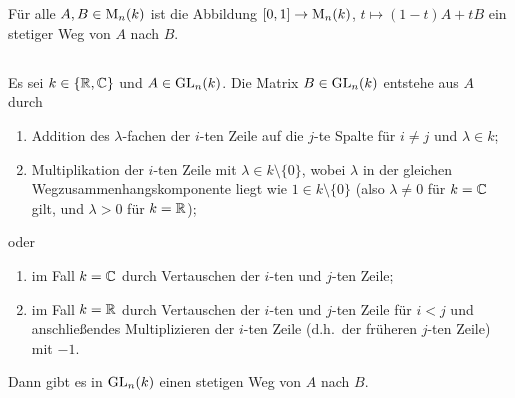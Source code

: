 \section{}





\subsection{}

Für alle $A, B \in \operatorname{M}_{n}(k)$ ist die Abbildung $[0,1] \to \operatorname{M}_{n}(k)$, $t \mapsto (1-t)A + tB$ ein stetiger Weg von $A$ nach $B$.





\subsection{}


\begin{proposition}
  \label{proposition: elemantery row operations}
  Es sei $k \in \{\mathbb{R}, \mathbb{C}\}$ und $A \in \operatorname{GL}_{n}(k)$.
  Die Matrix $B \in \operatorname{GL}_{n}(k)$ entstehe aus $A$ durch
  \begin{enumerate}[label = \alph*)]
    \item
      \label{operation: adding multiples to other rows}
      Addition des $\lambda$-fachen der $i$-ten Zeile auf die $j$-te Spalte für $i \neq j$ und $\lambda \in k$;
    \item
      \label{operation: scaling rows}
      Multiplikation der $i$-ten Zeile mit $\lambda \in k \setminus \{0\}$, wobei $\lambda$ in der gleichen Wegzusammenhangskomponente liegt wie $1 \in k \setminus \{0\}$
      (also $\lambda \neq 0$ für $k = \mathbb{C}$ gilt, und $\lambda > 0$ für $k = \mathbb{R}$);
  \end{enumerate}
  oder
  \begin{enumerate}[label = \alph*), resume]
    \item
      \label{operation: swapping rows}
      im Fall $k = \mathbb{C}$ durch Vertauschen der $i$-ten und $j$-ten Zeile;
    \item
      \label{operation: modified swapping rows}
      im Fall $k = \mathbb{R}$ durch Vertauschen der $i$-ten und $j$-ten Zeile für $i < j$ und anschließendes Multiplizieren der $i$-ten Zeile (d.h.\ der früheren $j$-ten Zeile) mit $-1$.
  \end{enumerate}
  Dann gibt es in $\operatorname{GL}_{n}(k)$ einen stetigen Weg von $A$ nach $B$.
\end{proposition}

